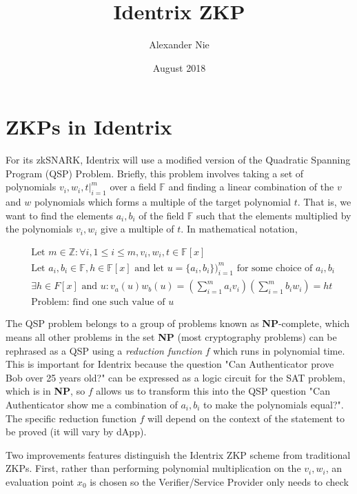 \documentclass{article}
\title{Identrix ZKP}
\author{Alexander Nie}
\date{August 2018}
\begin{document}
\maketitle

\section*{ZKPs in Identrix}

For its zkSNARK, Identrix will use a modified version of the Quadratic Spanning Program (QSP) Problem. Briefly, this problem involves taking a set of polynomials $v_i,w_i, t\big|_{i=1}^m$ over a field $\mathbb{F}$ and finding a linear combination of the $v$ and $w$ polynomials which forms a multiple of the target polynomial $t$. That is, we want to find the elements $a_i,b_i$ of the field $\mathbb{F}$ such that the elements multiplied by the polynomials $v_i, w_i$ give a multiple of $t$. In mathematical notation,

\begin{align}
&\text{Let } m\in \mathbb{Z}: \forall i, 1\leq i \leq m, v_i,w_i,t\in \mathbb{F}[x]\\
&\text{Let } a_i,b_i\in \mathbb{F}, h\in \mathbb{F}[x] \text{ and let } u = \{a_i,b_i\})_{i=1}^m \text{ for some choice of } a_i, b_i\\
&\exists h\in F[x] \text{ and } u : v_a(u)w_b(u)=\left(\sum_{i=1}^m a_i v_i\right)\left(\sum_{i=1}^m b_i w_i\right) = ht\\
&\text{Problem: find one such value of } u
\end{align}

The QSP problem belongs to a group of problems known as \textbf{NP}-complete, which means all other problems in the set \textbf{NP} (most cryptography problems) can be rephrased as a QSP using a \textit{reduction function} $f$ which runs in polynomial time. This is important for Identrix because the question "Can Authenticator prove Bob over 25 years old?" can be expressed as a logic circuit for the SAT problem, which is in \textbf{NP}, so $f$ allows us to transform this into the QSP question "Can Authenticator show me a combination of $a_i,b_i$ to make the polynomials equal?". The specific reduction function $f$ will depend on the context of the statement to be proved (it will vary by dApp).

Two improvements features distinguish the Identrix ZKP scheme from traditional ZKPs. First, rather than performing polynomial multiplication on the $v_i,w_i$, an evaluation point $x_0$ is chosen so the Verifier/Service Provider only needs to check
\end{document}
